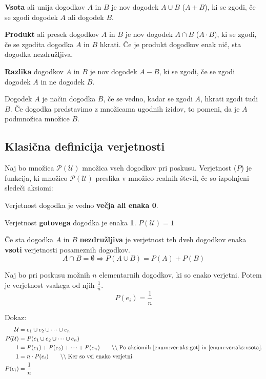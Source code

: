 \documentclass[a4paper,oneside,12pt,fleqn]{article}
\newcommand\krat\cdot
\newcommand{\comment}[1]{\ensuremath{\qquad\backslash\backslash\;}\textnormal{#1}}
\renewcommand\implies\Rightarrow
\numberwithin{equation}{section}
\newenvironment{enumerate*}%
{
\vspace{-12pt}%
\begin{enumerate}%
\setlength{\itemsep}{0pt}%
\setlength{\parskip}{2pt}}%
{\end{enumerate}}
\begin{document}
\textbf{Vsota} ali unija dogodkov $A$ in $B$ je nov dogodek $A \cup B$ ($A+B$), ki se zgodi, če se
zgodi dogodek $A$ ali dogodek $B$.

\textbf{Produkt} ali presek dogodkov $A$ in $B$ je nov dogodek $A \cap B$ ($A\krat B$), ki se
zgodi, če se zgodita dogodka $A$ in $B$ hkrati. Če je produkt dogodkov enak nič, sta
dogodka nezdružljiva.

\textbf{Razlika} dogodkov $A$ in $B$ je nov dogodek $A - B$, ki se zgodi, če se zgodi dogodek $A$
in ne dogodek $B$.

Dogodek $A$ je način dogodka $B$, če se vedno, kadar se zgodi $A$, hkrati zgodi tudi $B$.
Če dogodka predstavimo z množicama ugodnih izidov, to pomeni, da je $A$ podmnožica množice
$B$.

\subsection{Klasična definicija verjetnosti}
\label{sec:verj:def}

Naj bo množica $\mathcal P(\mathcal U)$ množica vseh dogodkov pri poskusu. Verjetnost ($P$) je
funkcija, ki množico $\mathcal P (\mathcal U)$ preslika v množico realnih števil, če so
izpolnjeni sledeči aksiomi:
\begin{enumerate*}
  \item Verjetnost dogodka je vedno \textbf{večja ali enaka 0}.
  \item Verjetnost \textbf{gotovega} dogodka je enaka \textbf{1}. $P(\mathcal U) = 1$
    \label{enum:ver:aks:got}
  \item Če sta dogodka $A$ in $B$ \textbf{nezdružljiva} je verjetnost teh dveh dogodkov
    enaka \textbf{vsoti} verjetnosti posameznih dogodkov.
    \[ A \cap B = \emptyset \implies P(A \cup B) = P(A) + P(B) \] \label{enum:ver:aks:vsota}
\end{enumerate*}

\vspace{-5ex}
Naj bo pri poskusu možnih $n$ elementarnih dogodkov, ki so enako verjetni. Potem je
verjetnost vsakega od njih $\frac{1}{n}$.
\[ P(e_i) = \frac{1}{n} \]

Dokaz:
\begin{align*}
  \mathcal U &=  e_1 \cup e_2 \cup \cdots \cup e_n \\
  P(\mathcal U) &= P(e_1 \cup e_2 \cup \cdots \cup e_n) \\
  1 &= P(e_1) + P(e_2) + \cdots + P(e_n) \comment{Po aksiomih \ref{enum:ver:aks:got} in
  \ref{enum:ver:aks:vsota}.} \\
  1 &= n\krat P(e_i) \comment{Ker so vsi enako verjetni.} \\
  P(e_i) &= \frac{1}{n}
\end{align*}
\end{document}
